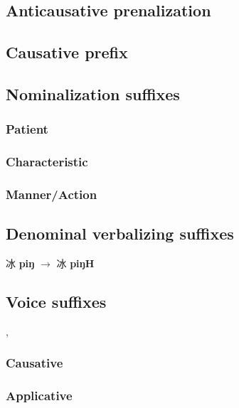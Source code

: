 \documentclass[oneside,a4paper,11pt]{article}
\newcommand{\ipa}[1]{\textbf{{\phon\mbox{#1}}}} %
\newcommand{\zh}[1]{{\cn #1}}
\begin{document}
\subsection{Anticausative prenalization}
\citet{sagart03prenasalized}
\citet{jacques15spontaneous, jacques15causative}

\subsection{Causative prefix}
\citet{sagart12sprefix}
\citet{jacques15causative}

\subsection{Nominalization suffixes}
\citet{jacques16ssuffixes}

\subsubsection{Patient}

\subsubsection{Characteristic}




\subsubsection{Manner/Action}

\subsection{Denominal verbalizing suffixes}
\zh{冰} \ipa{piŋ} $\rightarrow$ \zh{冰} \ipa{piŋH}
\citealt{downer59} \citet[39]{sunyw07biandiao}

\subsection{Voice suffixes}
\citet{jacques16ssuffixes}, \citet{jacques16si}

\subsubsection{Causative}

\subsubsection{Applicative}
\end{document}
